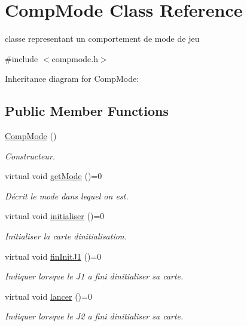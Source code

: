 \hypertarget{class_comp_mode}{}\section{Comp\+Mode Class Reference}
\label{class_comp_mode}


classe representant un comportement de mode de jeu  




{\ttfamily \#include $<$compmode.\+h$>$}



Inheritance diagram for Comp\+Mode\+:
\subsection*{Public Member Functions}
\begin{DoxyCompactItemize}
\item 
\hyperlink{class_comp_mode_aab4f503377e812cd05e2f1914c2faae3}{Comp\+Mode} ()
\begin{DoxyCompactList}\small\item\em Constructeur. \end{DoxyCompactList}\item 
virtual void \hyperlink{class_comp_mode_a897f6f474d86453c91ab83ab61c6f031}{get\+Mode} ()=0
\begin{DoxyCompactList}\small\item\em Décrit le mode dans lequel on est. \end{DoxyCompactList}\item 
virtual void \hyperlink{class_comp_mode_a3559cd952b7f3c6f8e7f22f6f3dc23ae}{initialiser} ()=0
\begin{DoxyCompactList}\small\item\em Initialiser la carte d\textquotesingle{}initialisation. \end{DoxyCompactList}\item 
virtual void \hyperlink{class_comp_mode_a1e3c25af2e4e655d8ab55b77854069d7}{fin\+Init\+J1} ()=0
\begin{DoxyCompactList}\small\item\em Indiquer lorsque le J1 a fini d\textquotesingle{}initialiser sa carte. \end{DoxyCompactList}\item 
virtual void \hyperlink{class_comp_mode_a311cf95ec88795dfb14dbed569a7d54f}{lancer} ()=0
\begin{DoxyCompactList}\small\item\em Indiquer lorsque le J2 a fini d\textquotesingle{}initialiser sa carte. \end{DoxyCompactList}\item 

\end{DoxyCompactItemize}

